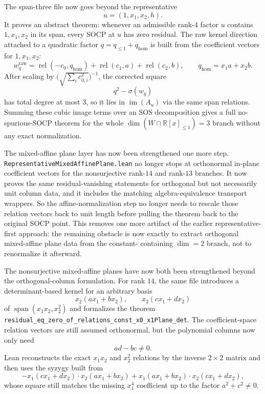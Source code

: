 \documentclass[11pt]{article}
\begin{document}
The span-three file now goes beyond the representative
\[
  u = (1,x_1,x_2,h).
\]
It proves an abstract theorem: whenever an admissible rank-$4$ factor $u$
contains $1,x_1,x_2$ in its span, every SOCP at $u$ has zero residual. The raw
kernel direction attached to a quadratic factor $q=q_{\le 1}+q_{\mathrm{hom}}$
is built from the coefficient vectors for $1,x_1,x_2$:
\[
  w_q^{\mathrm{raw}}
  =
  \operatorname{rel}(-c_0,q_{\mathrm{hom}})
  + \operatorname{rel}(c_1,a)
  + \operatorname{rel}(c_2,b),
  \qquad q_{\mathrm{hom}} = x_1 a + x_2 b.
\]
After scaling by $\bigl(\sqrt{\sum_i c_{0,i}^2}\bigr)^{-1}$, the corrected
square
\[
  q^2 - \sigma(w_q)
\]
has total degree at most $3$, so it lies in $\operatorname{im}(A_u)$ via the
same span relations. Summing these cubic image terms over an SOS decomposition
gives a full no-spurious-SOCP theorem for the whole
$\dim(W \cap \mathbb{R}[x]_{\le 1}) = 3$ branch without any exact
normalization.

The mixed-affine plane layer has now been strengthened one more step.
\texttt{RepresentativeMixedAffinePlane.lean} no longer stops at orthonormal
in-plane coefficient vectors for the nonsurjective rank-$14$ and rank-$13$
branches. It now proves the same residual-vanishing statements for orthogonal
but not necessarily unit column data, and it includes the matching
algebra-equivalence transport wrappers. So the affine-normalization step no
longer needs to rescale those relation vectors back to unit length before
pulling the theorem back to the original SOCP point. This removes one more
artifact of the earlier representative-first approach: the remaining obstacle
is now exactly to extract orthogonal mixed-affine plane data from the constant-
containing $\dim=2$ branch, not to renormalize it afterward.

The nonsurjective mixed-affine planes have now both been strengthened beyond
the orthogonal-column formulation. For rank $14$, the same file introduces a
determinant-based kernel for an arbitrary basis
\[
  x_2(a x_1+b x_2),\qquad x_2(c x_1+d x_2)
\]
of \(\operatorname{span}(x_1x_2,x_2^2)\) and formalizes the theorem
\texttt{residual\_eq\_zero\_of\_relations\_const\_x0\_x1Plane\_det}. The
coefficient-space relation vectors are still assumed orthonormal, but the
polynomial columns now only need
\[
  ad-bc \neq 0.
\]
Lean reconstructs the exact \(x_1x_2\) and \(x_2^2\) relations by the inverse
\(2\times2\) matrix and then uses the syzygy built from
\[
  -x_1(c x_1+d x_2)\cdot x_2(a x_1+b x_2)
  +x_1(a x_1+b x_2)\cdot x_2(c x_1+d x_2),
\]
whose square still matches the missing \(x_1^4\) coefficient up to the factor
\(a^2+c^2\neq 0\).
\end{document}
